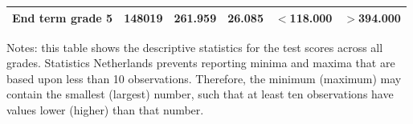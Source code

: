\begin{table}[h!]
\begin{center}
\begin{tabular}{lccccc}
End term grade 5    &      148019&     261.959&      26.085&      $<$118.000&     $>$394.000\\
\bottomrule \bottomrule
\end{tabular}
\begin{tablenotes}
\footnotesize
\item[] Notes: this table shows the descriptive statistics for the test scores across all grades. Statistics Netherlands prevents reporting minima and maxima that are based upon less than 10 observations. Therefore, the minimum (maximum) may contain the smallest (largest) number, such that at least ten observations have values lower (higher) than that number. 
\end{tablenotes}
\end{center}
\end{table}
